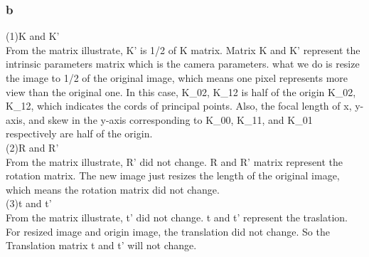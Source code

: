 \documentclass[]{article}
\begin{document}
\subsubsection{b}
(1)K and K'\\
From the matrix illustrate, K' is 1/2 of K matrix. Matrix K and K' represent the intrinsic parameters matrix which is the camera parameters. what we do is resize the image to 1/2 of the original image, which means one pixel represents more view than the original one. In this case, K\_02, K\_12 is half of the origin K\_02, K\_12, which indicates the cords of principal points. Also, the focal length of x, y-axis, and skew in the y-axis corresponding to K\_00, K\_11, and K\_01 respectively are half of the origin.\\
(2)R and R'\\
From the matrix illustrate, R' did not change. R and R' matrix represent the rotation matrix. The new image just resizes the length of the original image, which means the rotation matrix did not change.\\
(3)t and t'\\
From the matrix illustrate, t' did not change. t and t' represent the traslation. For resized image and origin image, the translation did not change. So the Translation matrix t and t' will not change.

\section{}
\end{document}

